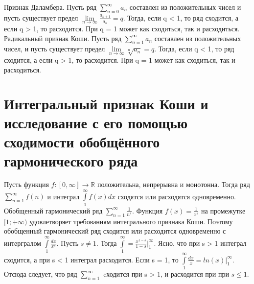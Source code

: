 \documentclass[12pt, a4paper]{article}
\begin{document}
Признак Даламбера. Пусть ряд  $\sum\limits_{n=0}^{\infty}a_n$ составлен из положительных чисел и пусть существует предел $\lim\limits_{n \to \infty} \frac{a_{n + 1}}{a_{n}} = q$. Тогда, если q < 1, то ряд сходится, а если q > 1, то расходится. При q = 1 может как сходиться, так и расходиться.
\newline
Радикальный признак Коши. Пусть ряд $\sum\limits_{n=1}^{\infty}a_{n}$ составлен из положительных чисел, и пусть существует предел  $\lim\limits_{n \to \infty} \sqrt[n]{a_{n}} = q$. Тогда, если q < 1, то ряд сходится, а если q > 1, то расходится. При q = 1 может как сходиться, так и расходиться.


\section{Интегральный признак Коши и исследование с его помощью сходимости обобщённого гармонического ряда}
Пусть функция $f : [0, \infty] \to \mathbb{R}$ положительна, непрерывна и монотонна. Тогда ряд $\sum\limits_{n=1}^{\infty}f(n)$ и интеграл $\int\limits_1^\infty f(x) dx$ сходятся или расходятся одновременно. 
\newline
Обобщенный гармонический ряд $\sum\limits_{n=1}^{\infty}\frac{1}{n^s}$. Функция $f(x) = \frac{1}{x^s}$ на промежутке $[1; +\infty)$ удовлетворяет требованиям интегрального признака Коши. Поэтому обобщенный гармонический ряд сходится или расходится одновременно с интергралом $\int\limits_{1}^{\infty}\frac{dx}{x^s}$. Пусть $s \neq 1$. Тогда $\int\limits_{1}^{\infty} = \frac{x^{1 - s}}{1- s}\bigg|_1^{\infty}$. Ясно, что при s > 1 интеграл сходится, а при s < 1 интеграл расходится. Если s = 1, то $\int\limits_{1}^{\infty}\frac{dx}{x} = ln(x)\bigg|_1^{\infty}$. Отсюда следует, что ряд $\sum\limits_{n=1}^{\infty}$ cходится при s > 1, и расходится при при $s \leq 1$.
\end{document}
